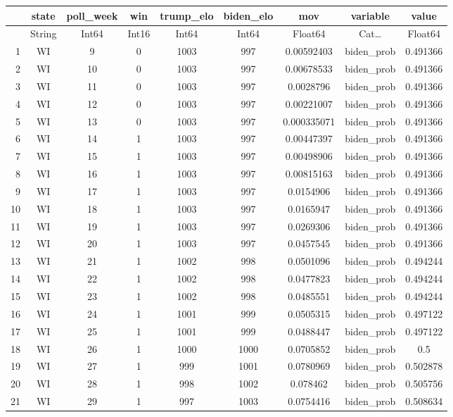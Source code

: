 \documentclass[12pt,a4paper]{article}
\begin{document}
\begin{tabular}{r|cccccccc}
	& state & poll\_week & win & trump\_elo & biden\_elo & mov & variable & value\\
	\hline
	& String & Int64 & Int16 & Int64 & Int64 & Float64 & Cat… & Float64\\
	\hline
	1 & WI & 9 & 0 & 1003 & 997 & 0.00592403 & biden\_prob & 0.491366 \\
	2 & WI & 10 & 0 & 1003 & 997 & 0.00678533 & biden\_prob & 0.491366 \\
	3 & WI & 11 & 0 & 1003 & 997 & 0.0028796 & biden\_prob & 0.491366 \\
	4 & WI & 12 & 0 & 1003 & 997 & 0.00221007 & biden\_prob & 0.491366 \\
	5 & WI & 13 & 0 & 1003 & 997 & 0.000335071 & biden\_prob & 0.491366 \\
	6 & WI & 14 & 1 & 1003 & 997 & 0.00447397 & biden\_prob & 0.491366 \\
	7 & WI & 15 & 1 & 1003 & 997 & 0.00498906 & biden\_prob & 0.491366 \\
	8 & WI & 16 & 1 & 1003 & 997 & 0.00815163 & biden\_prob & 0.491366 \\
	9 & WI & 17 & 1 & 1003 & 997 & 0.0154906 & biden\_prob & 0.491366 \\
	10 & WI & 18 & 1 & 1003 & 997 & 0.0165947 & biden\_prob & 0.491366 \\
	11 & WI & 19 & 1 & 1003 & 997 & 0.0269306 & biden\_prob & 0.491366 \\
	12 & WI & 20 & 1 & 1003 & 997 & 0.0457545 & biden\_prob & 0.491366 \\
	13 & WI & 21 & 1 & 1002 & 998 & 0.0501096 & biden\_prob & 0.494244 \\
	14 & WI & 22 & 1 & 1002 & 998 & 0.0477823 & biden\_prob & 0.494244 \\
	15 & WI & 23 & 1 & 1002 & 998 & 0.0485551 & biden\_prob & 0.494244 \\
	16 & WI & 24 & 1 & 1001 & 999 & 0.0505315 & biden\_prob & 0.497122 \\
	17 & WI & 25 & 1 & 1001 & 999 & 0.0488447 & biden\_prob & 0.497122 \\
	18 & WI & 26 & 1 & 1000 & 1000 & 0.0705852 & biden\_prob & 0.5 \\
	19 & WI & 27 & 1 & 999 & 1001 & 0.0780969 & biden\_prob & 0.502878 \\
	20 & WI & 28 & 1 & 998 & 1002 & 0.078462 & biden\_prob & 0.505756 \\
	21 & WI & 29 & 1 & 997 & 1003 & 0.0754416 & biden\_prob & 0.508634 \\

\end{tabular}
\end{document}
